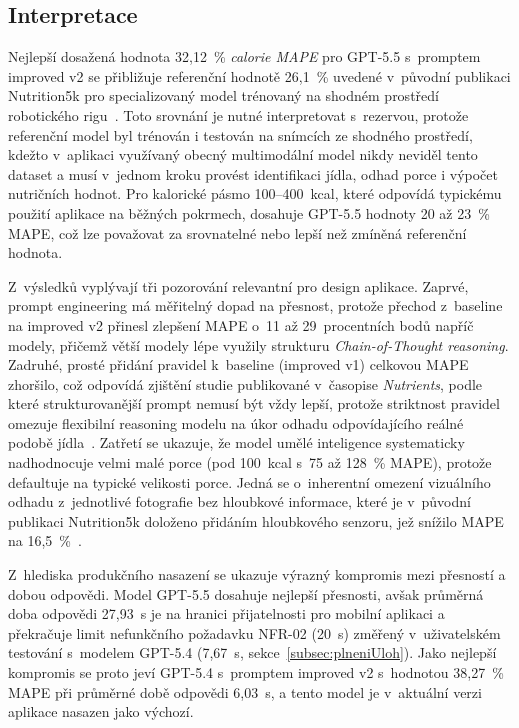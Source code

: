 \subsection{Interpretace}
\label{subsec:benchmarkInterpretace}
Nejlepší dosažená hodnota 32,12~\% \emph{calorie MAPE} pro GPT-5.5 s~promptem improved v2 se přibližuje referenční hodnotě 26,1~\% uvedené v~původní publikaci Nutrition5k pro specializovaný model trénovaný na shodném prostředí robotického rigu~\cite{thames2021nutrition5k}.
Toto srovnání je nutné interpretovat s~rezervou, protože referenční model byl trénován i testován na snímcích ze shodného prostředí, kdežto v~aplikaci využívaný obecný multimodální model nikdy neviděl tento dataset a musí v~jednom kroku provést identifikaci jídla, odhad porce i výpočet nutričních hodnot.
Pro kalorické pásmo 100--400~kcal, které odpovídá typickému použití aplikace na běžných pokrmech, dosahuje GPT-5.5 hodnoty 20 až 23~\% MAPE, což lze považovat za srovnatelné nebo lepší než zmíněná referenční hodnota.

Z~výsledků vyplývají tři pozorování relevantní pro design aplikace.
Zaprvé, prompt engineering má měřitelný dopad na přesnost, protože přechod z~baseline na improved v2 přinesl zlepšení MAPE o~11 až 29~procentních bodů napříč modely, přičemž větší modely lépe využily strukturu \emph{Chain-of-Thought reasoning}.
Zadruhé, prosté přidání pravidel k~baseline (improved v1) celkovou MAPE zhoršilo, což odpovídá zjištění studie publikované v~časopise \emph{Nutrients}, podle které strukturovanější prompt nemusí být vždy lepší, protože striktnost pravidel omezuje flexibilní reasoning modelu na úkor odhadu odpovídajícího reálné podobě jídla~\cite{ase2025structuredPrompts}.
Zatřetí se ukazuje, že model umělé inteligence systematicky nadhodnocuje velmi malé porce (pod 100~kcal s~75 až 128~\% MAPE), protože defaultuje na typické velikosti porce.
Jedná se o~inherentní omezení vizuálního odhadu z~jednotlivé fotografie bez hloubkové informace, které je v~původní publikaci Nutrition5k doloženo přidáním hloubkového senzoru, jež snížilo MAPE na 16,5~\%~\cite{thames2021nutrition5k}.

Z~hlediska produkčního nasazení se ukazuje výrazný kompromis mezi přesností a dobou odpovědi.
Model GPT-5.5 dosahuje nejlepší přesnosti, avšak průměrná doba odpovědi 27,93~s je na hranici přijatelnosti pro mobilní aplikaci a překračuje limit nefunkčního požadavku NFR-02 (20~s) změřený v~uživatelském testování s~modelem GPT-5.4 (7,67~s, sekce~\ref{subsec:plneniUloh}).
Jako nejlepší kompromis se proto jeví GPT-5.4 s~promptem improved v2 s~hodnotou 38,27~\% MAPE při průměrné době odpovědi 6,03~s, a tento model je v~aktuální verzi aplikace nasazen jako výchozí.

